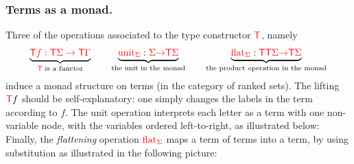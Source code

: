 \subsubsection{Terms as a monad.} Three of the operations associated to the type constructor ${\color{red}{\mathsf T}}$, namely  
\begin{align*}
        \underbrace{{\color{red}{{\color{red}{\mathsf T}}f : {\color{red}{\mathsf T}}\Sigma \to {\color{red}{\mathsf T}}\Gamma}}}_{\text{${\color{red}{\mathsf T}}$ is a functor}} \qquad  \underbrace{{\color{red}{\mathrm{unit}}}_{\color{red}{\Sigma}} : {\color{red}{\Sigma}} {\color{red}{\to}} {\color{red}{\mathsf T}} {\color{red}{\Sigma}}}_{\text{the unit in the monad}} \qquad  \underbrace{{\color{red}{\mathrm{flat}}}_{\color{red}{\Sigma}} : {\color{red}{\mathsf T}} {\color{red}{\mathsf T}} {\color{red}{\Sigma}} {\color{red}{\to}} {\color{red}{\mathsf T}} {\color{red}{\Sigma}}}_{\text{the product operation in the monad}}
\end{align*}
induce a monad structure on terms (in the category of ranked sets). The lifting ${\color{red}{\mathsf T}} f$ should be self-explanatory: one simply changes the labels in the term according to $f$. The  unit operation interprets each letter as a term with one non-variable node, with the variables ordered left-to-right,  as illustrated below:
Finally, the  \emph{flattening} operation ${\color{red}{\mathrm{flat}}}_{\color{red}{\Sigma}}$ 
        maps a term of terms into a term, by using substitution as illustrated in the following picture:  
    
